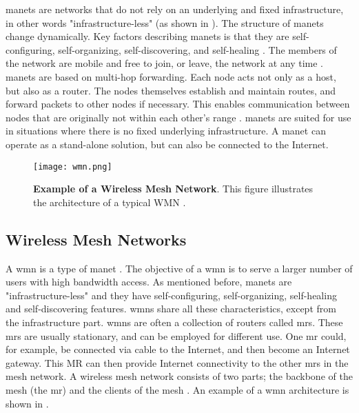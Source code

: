 \glspl{manet} are networks that do not rely on an underlying and fixed infrastructure, in other words "infrastructure-less" (as shown in ). The structure of \glspl{manet} change dynamically. Key factors describing \glspl{manet} is that they are self-configuring, self-organizing, self-discovering, and self-healing \cite{wmn}. The members of the network are mobile and free to join, or leave, the network at any time \cite{adhoc2}. \glspl{manet} are based on multi-hop forwarding. Each node acts not only as a host, but also as a router. The nodes themselves establish and maintain routes, and forward packets to other nodes if necessary. This enables communication between nodes that are originally not within each other's range \cite{adhoc2}. \glspl{manet} are suited for use in situations where there is no fixed underlying infrastructure. A \gls{manet} can operate as a stand-alone solution, but can also be connected to the Internet. 

\begin{figure}[t]
  \centering
    \texttt{[image: wmn.png]}
     \caption [Example of a Wireless Mesh Network]{\textbf{Example of a Wireless Mesh Network}. This figure illustrates the architecture of a typical WMN \cite{wmn}.}
\label{fig:wmn}
\end{figure}

\subsection{Wireless Mesh Networks}
\label{subsec:mesh}
A \gls{wmn} is a type of \gls{manet} \cite{wmn}. The objective of a \gls{wmn} is to serve a larger number of users with high bandwidth access. As mentioned before, \glspl{manet} are "infrastructure-less" and they have self-configuring, self-organizing, self-healing and self-discovering features. \glspl{wmn} share all these characteristics, except from the infrastructure part. \glspl{wmn} are often a collection of routers called \glspl{mr}. These \glspl{mr} are usually stationary, and can be employed for different use. One \gls{mr} could, for example, be connected via cable to the Internet, and then become an Internet gateway. This MR can then provide Internet connectivity to the other \glspl{mr} in the mesh network. A wireless mesh network consists of two parts; the backbone of the mesh (the \gls{mr}) and the clients of the mesh \cite{wmn}. An example of a \gls{wmn} architecture is shown in . 


